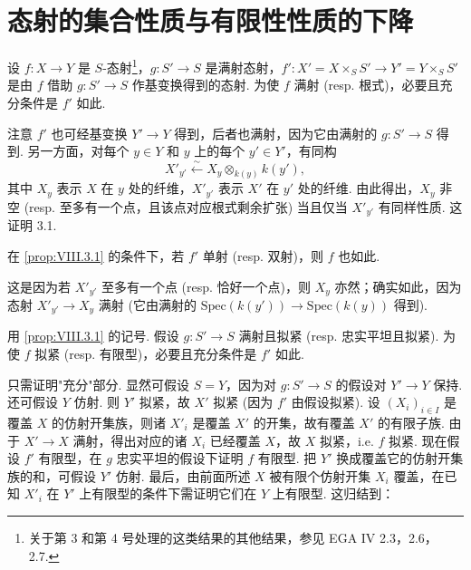\section{态射的集合性质与有限性性质的下降}

\begin{proposition}\label{prop:VIII.3.1}
设 $f \colon X \to Y$ 是 $S$-态射\footnote{关于第 3 和第 4 号处理的这类结果的其他结果，参见 EGA IV 2.3，2.6，2.7.}，$g \colon S' \to S$ 是满射态射，$f' \colon X' = X \times_S S' \to Y' = Y \times_S S'$ 是由 $f$ 借助 $g \colon S' \to S$ 作基变换得到的态射. 为使 $f$ 满射 (resp. 根式)，必要且充分条件是 $f'$ 如此.
\end{proposition}

注意 $f'$ 也可经基变换 $Y' \to Y$ 得到，后者也满射，因为它由满射的 $g \colon S' \to S$ 得到. 另一方面，对每个 $y \in Y$ 和 $y$ 上的每个 $y' \in Y'$，有同构
\[
X'_{y'} \xleftarrow{\sim} X_y \otimes_{k(y)} k(y'),
\]
其中 $X_y$ 表示 $X$ 在 $y$ 处的纤维，$X'_{y'}$ 表示 $X'$ 在 $y'$ 处的纤维. 由此得出，$X_y$ 非空 (resp. 至多有一个点，且该点对应根式剩余扩张) 当且仅当 $X'_{y'}$ 有同样性质. 这证明 3.1.

\begin{corollary}\label{cor:VIII.3.2}
在 \ref{prop:VIII.3.1} 的条件下，若 $f'$ 单射 (resp. 双射)，则 $f$ 也如此.
\end{corollary}

这是因为若 $X'_{y'}$ 至多有一个点 (resp. 恰好一个点)，则 $X_y$ 亦然；确实如此，因为态射 $X'_{y'} \to X_y$ 满射 (它由满射的 $\mathrm{Spec}(k(y')) \to \mathrm{Spec}(k(y))$ 得到).

\begin{proposition}\label{prop:VIII.3.3}
用 \ref{prop:VIII.3.1} 的记号. 假设 $g \colon S' \to S$ 满射且拟紧 (resp. 忠实平坦且拟紧). 为使 $f$ 拟紧 (resp. 有限型)，必要且充分条件是 $f'$ 如此.
\end{proposition}

只需证明"充分"部分. 显然可假设 $S = Y$，因为对 $g \colon S' \to S$ 的假设对 $Y' \to Y$ 保持. 还可假设 $Y$ 仿射. 则 $Y'$ 拟紧，故 $X'$ 拟紧 (因为 $f'$ 由假设拟紧). 设 $(X_i)_{i \in I}$ 是覆盖 $X$ 的仿射开集族，则诸 $X'_i$ 是覆盖 $X'$ 的开集，故有覆盖 $X'$ 的有限子族. 由于 $X' \to X$ 满射，得出对应的诸 $X_i$ 已经覆盖 $X$，故 $X$ 拟紧，i.e. $f$ 拟紧. 现在假设 $f'$ 有限型，在 $g$ 忠实平坦的假设下证明 $f$ 有限型. 把 $Y'$ 换成覆盖它的仿射开集族的和，可假设 $Y'$ 仿射. 最后，由前面所述 $X$ 被有限个仿射开集 $X_i$ 覆盖，在已知 $X'_i$ 在 $Y'$ 上有限型的条件下需证明它们在 $Y$ 上有限型. 这归结到：

